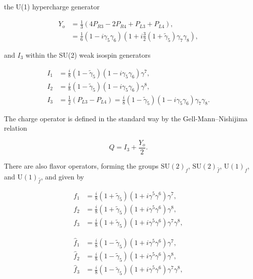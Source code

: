 \documentclass[12pt]{article}
\renewcommand\[{\begin{dmath}}
\renewcommand\]{\end{dmath}}
\begin{document}
\noindent the U(1) hypercharge generator

\begin{equation}
\begin{split}Y_o & =\frac{1}{3}\left(4P_{R3}-2P_{R4}+P_{L3}+P_{L4}\right),\\
 & =\frac{1}{6}\left(1-i\gamma_{5}\gamma_{6}\right)\left(1+i\frac{3}{2}(1+\tilde{\gamma}_{5})\gamma_{7}\gamma_{8}\right),
\end{split}
\label{eq:2.5.5}
\end{equation}

\noindent and   $I_{3}$ within  the SU(2) weak isospin generators

\begin{equation}
\begin{split}I_{1} & ={\displaystyle \frac{i}{8}(1-\tilde{\gamma}_{5})(1-i\gamma_{5}\gamma_{6})\gamma^{7}},\\
I_{2} & {\displaystyle =\frac{i}{8}(1-\tilde{\gamma}_{5})(1-i\gamma_{5}\gamma_{6})\gamma^{8}},\\
I_{3} & =\frac{1}{2}(P_{L3}-P_{L4})=\frac{i}{8}(1-\tilde{\gamma}_{5})(1-i\gamma_{5}\gamma_{6})\gamma_{7}\gamma_{8}.
\end{split}
\label{eq:2.5.6}
\end{equation}

\noindent The charge operator is defined in the standard way by the
Gell-Mann--Nishijima relation

\begin{equation}
Q=I_{3}+\frac{Y_o}{2}.\label{eq:2.5.7}
\end{equation}

There are also flavor operators, forming the groups $\textrm{SU}(2)_{f}$,
$\textrm{SU}(2)_{\hat{f}}$, $\textrm{U}(1)_{f}$, and $\textrm{U}(1)_{\hat{f}}$,
and given by

\begin{equation}
\begin{split}f_{1} & =\frac{i}{8}\left(1+\tilde{\gamma}_{5}\right)\left(1+i\gamma^{5}\gamma^{6}\right)\gamma^{7},\\
f_{2} & =\frac{i}{8}\left(1+\tilde{\gamma}_{5}\right)\left(1+i\gamma^{5}\gamma^{6}\right)\gamma^{8},\\
f_{3} & =\frac{i}{8}\left(1+\tilde{\gamma}_{5}\right)\left(1+i\gamma^{5}\gamma^{6}\right)\gamma^{7}\gamma^{8},
\end{split}
\label{eq:2.5.8}
\end{equation}

\begin{equation}
\begin{split}\hat{f}_{1} & =\frac{i}{8}\left(1-\tilde{\gamma}_{5}\right)\left(1+i\gamma^{5}\gamma^{6}\right)\gamma^{7},\\
\hat{f}_{2} & =\frac{i}{8}\left(1-\tilde{\gamma}_{5}\right)\left(1+i\gamma^{5}\gamma^{6}\right)\gamma^{8},\\
\hat{f}_{3} & =\frac{i}{8}\left(1-\tilde{\gamma}_{5}\right)\left(1+i\gamma^{5}\gamma^{6}\right)\gamma^{7}\gamma^{8},
\end{split}
\label{eq:2.5.9}
\end{equation}
\end{document}
